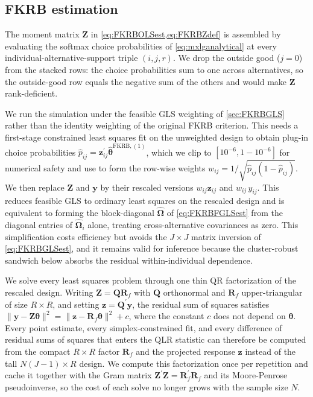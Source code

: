 \subsection{FKRB estimation}
\label{sec:implementation:fkrb}
The moment matrix $\bm{Z}$ in \cref{eq:FKRBOLSest,eq:FKRBZdef} is assembled by evaluating the softmax choice probabilities of \cref{eq:mxlganalytical} at every individual-alternative-support triple $(i,j,r)$.
We drop the outside good ($j=0$) from the stacked rows: the choice probabilities sum to one across alternatives, so the outside-good row equals the negative sum of the others and would make $\bm{Z}$ rank-deficient.

We run the simulation under the feasible GLS weighting of \cref{sec:FKRBGLS} rather than the identity weighting of the original FKRB criterion.
This needs a first-stage constrained least squares fit on the unweighted design to obtain plug-in choice probabilities $\hat{p}_{ij} = \bm{z}_{ij}^\prime \hat{\bm{\theta}}^{\mathrm{FKRB,(1)}}$, which we clip to $[10^{-6}, 1-10^{-6}]$ for numerical safety and use to form the row-wise weights $w_{ij} = 1/\sqrt{\hat{p}_{ij}(1 - \hat{p}_{ij})}$.
We then replace $\bm{Z}$ and $\bm{y}$ by their rescaled versions $w_{ij}\bm{z}_{ij}$ and $w_{ij}\,y_{ij}$.
This reduces feasible GLS to ordinary least squares on the rescaled design \citep[see][chap.~9]{Greene2019} and is equivalent to forming the block-diagonal $\hat{\bm{\Omega}}$ of \cref{eq:FKRBFGLSest} from the diagonal entries of $\hat{\bm{\Omega}}_i$ alone, treating cross-alternative covariances as zero.
This simplification costs efficiency but avoids the $J\times J$ matrix inversion of \cref{eq:FKRBGLSest}, and it remains valid for inference because the cluster-robust sandwich below absorbs the residual within-individual dependence.

We solve every least squares problem through one thin QR factorization of the rescaled design.
Writing $\bm{Z} = \bm{Q}\bm{R}_{f}$ with $\bm{Q}$ orthonormal and $\bm{R}_{f}$ upper-triangular of size $R\times R$, and setting $\bm{z} = \bm{Q}^\prime\bm{y}$, the residual sum of squares satisfies $\|\bm{y} - \bm{Z}\bm{\theta}\|^2 = \|\bm{z} - \bm{R}_{f}\bm{\theta}\|^2 + c$, where the constant $c$ does not depend on $\bm{\theta}$.
Every point estimate, every simplex-constrained fit, and every difference of residual sums of squares that enters the QLR statistic can therefore be computed from the compact $R\times R$ factor $\bm{R}_{\!f}$ and the projected response $\bm{z}$ instead of the tall $N(J-1)\times R$ design.
We compute this factorization once per repetition and cache it together with the Gram matrix $\bm{Z}^\prime\bm{Z} = \bm{R}_{\!f}^\prime\bm{R}_{\!f}$ and its Moore-Penrose pseudoinverse, so the cost of each solve no longer grows with the sample size $N$.


